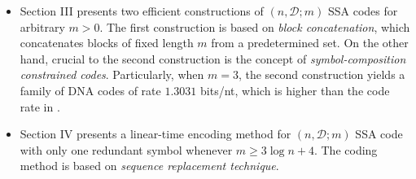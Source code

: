 \documentclass[conference]{IEEEtran}
\theoremstyle{plain}
\theoremstyle{definition}
\newcommand{\D}{{\mathcal D}}
\renewcommand{\ge}{\geqslant}
\begin{document}
\begin{itemize}
\item Section III presents two efficient constructions of  $(n,\D;m)$ SSA codes for arbitrary $m>0$. The first construction is based on {\em block concatenation}, which concatenates blocks of fixed length $m$ from a predetermined set. On the other hand, crucial to the second construction is the concept of {\em symbol-composition constrained codes}. Particularly, when $m = 3$, the second construction yields a family of DNA codes of rate $1.3031$ bits/nt, which is higher than the code rate in \cite{K:2021}. 
\item Section IV presents a linear-time encoding method for $(n,\D;m)$ SSA code with only one redundant symbol whenever $m\ge 3 \log n+4$. The coding method is based on {\em sequence replacement technique}. %

\end{itemize}
\end{document}

